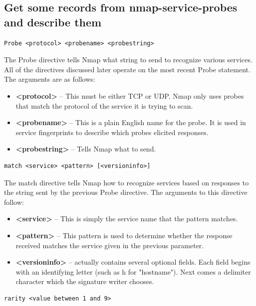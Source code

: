 \documentclass[14pt,a4paper,report]{report}
\begin{document}


\subsection{Get some records from nmap-service-probes and describe them}

\begin{verbatim}
Probe <protocol> <probename> <probestring>
\end{verbatim}

The Probe directive tells Nmap what string to send to recognize various services. All of the directives discussed later operate on the most recent Probe statement. The arguments are as follows:

\begin{itemize}
	\item \textbf{<protocol>} -- This must be either TCP or UDP. Nmap only uses probes that match the protocol of the service it is trying to scan.
	\item \textbf{<probename>} -- This is a plain English name for the probe. It is used in service fingerprints to describe which probes elicited responses.
	\item \textbf{<probestring>} -- Tells Nmap what to send.
\end{itemize}


\begin{verbatim}
match <service> <pattern> [<versioninfo>]
\end{verbatim}

The match directive tells Nmap how to recognize services based on responses to the string sent by the previous Probe directive. The arguments to this directive follow:

\begin{itemize}
	\item \textbf{<service>} -- This is simply the service name that the pattern matches.
	\item \textbf{<pattern>} -- This pattern is used to determine whether the response received matches the service given in the previous parameter.
	\item \textbf{<versioninfo>} -- actually contains several optional fields. Each field begins with an identifying letter (such as h for "hostname"). Next comes a delimiter character which the signature writer chooses.
\end{itemize}

\begin{verbatim}
rarity <value between 1 and 9>
\end{verbatim}
\end{document}
